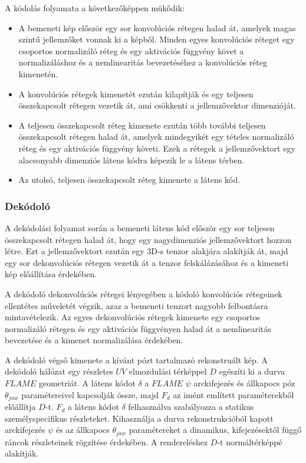 \documentclass[12pt,a4]{article}
\begin{document}
    
                A kódolás folyamata a következőképpen mükődik:
                \begin{itemize}
    	           \item A bemeneti kép először egy sor konvolúciós rétegen halad át, amelyek magas szintű jellemzőket vonnak ki a képből. Minden egyes konvolúciós réteget egy csoportos normalizáló réteg és egy aktivációs függvény követ a normalizáláshoz és a nemlinearitás bevezetéséhez a konvolúciós réteg kimenetén.
                
    	           \item A konvolúciós rétegek kimenetét ezután kilapítják és egy teljesen összekapcsolt rétegen vezetik át, ami csökkenti a jellemzővektor dimenzióját.
                
    	           \item A teljesen összekapcsolt réteg kimenete ezután több további teljesen összekapcsolt rétegen halad át, amelyek mindegyikét egy tételes normalizáló réteg és egy aktivációs függvény követi. Ezek a rétegek a jellemzővektort egy alacsonyabb dimenziós látens kódra képezik le a látens térben.
                
    	           \item Az utolsó, teljesen összekapcsolt réteg kimenete a látens kód.
    	           
                \end{itemize}
    
            \subsubsection{Dekódoló} \label{Dekódoló}
    
                A dekódolási folyamat során a bemeneti látens kód először egy sor teljesen összekapcsolt rétegen halad át, hogy egy nagydimenziós jellemzővektort hozzon létre. Ezt a jellemzővektort ezután egy 3D-s tenzor alakjára alakítják át, majd egy sor dekonvolúciós rétegen vezetik át a tenzor felskálázásához és a kimeneti kép előállítása érdekében.
    
                A dekódoló dekonvolúciós rétegei lényegében a kódoló konvolúciós rétegeinek ellentétes műveletét végzik, azaz a bemeneti tenzort nagyobb felbontásra mintavételezik. Az egyes dekonvolúciós rétegek kimenete egy csoportos normalizáló rétegen és egy aktivációs függvényen halad át a nemlinearitás bevezetése és a kimenet normalizálása érdekében.
    
                A dekódoló végső kimenete a kívánt pózt tartalmazó rekonstruált kép. A dekódoló hálózat egy részletes $UV$ elmozdulási térképpel $D$ egészíti ki a durva $FLAME$ geometriát. A látens kódot $\delta$
     	        a $FLAME$ $\psi$ arckifejezés és állkapocs póz $\theta_{jaw}$ paramétereivel kapcsolják
     	          össze, majd $F_{d}$ az imént említett paraméterekből előállítja $D$-t. 
                $F_{d}$ a látens kódot $\delta$ felhasználva szabályozza a statikus személyspecifikus részleteket. Kihasználja a durva rekonstrukcióból kapott arckifejezés $\psi$ és az állkapocs $\theta_{jaw}$ paramétereket a dinamikus, kifejezésektől függő ráncok részleteinek rögzítése érdekében. A rendereléshez $D$-t normáltérképpé alakítják.
\end{document}
